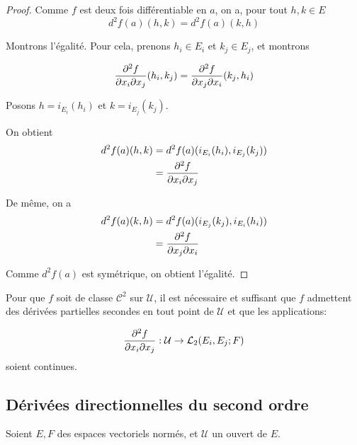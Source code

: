 \ifdefined\outputproof
\begin{proof}
	Comme $f$ est deux fois différentiable en $a$, on a, pour tout $h, k \in E$
	\begin{equation}
		d^{2}f(a) (h, k) = d^{2}f(a) (k, h)
	\end{equation}

	Montrons l'égalité. Pour cela, prenons $h_{i} \in E_{i}$ et $k_{j} \in
	E_{j}$, et montrons

	\begin{equation}
		\pdv{f}{x_{i}}{x_{j}} (a) (h_{i}, k_{j}) = \pdv{f}{x_{j}}{x_{i}} (a)
		(k_{j}, h_{i})
	\end{equation}

	Posons $h = i_{E_{i}}(h_{i})$ et $k = i_{E_{j}} (k_{j})$.

	On obtient
	\begin{align*}
		d^{2} f(a) (h, k) &= d^{2} f(a) (i_{E_{i}} (h_{i}), i_{E_{j}}(k_{j})) \\
		&= \pdv{f}{x_{i}}{x_{j}} (h_{i}, k_{j})
	\end{align*}

	De même, on a
	\begin{align*}
		d^{2} f(a) (k, h) &= d^{2} f(a) (i_{E_{j}} (k_{j}), i_{E_{i}}(h_{i})) \\
		&= \pdv{f}{x_{j}}{x_{i}} (k_{j}, h_{i})
	\end{align*}

	Comme $d^{2}f(a)$ est symétrique, on obtient l'égalité.
\end{proof}
\fi


\begin{proposition}
	Pour que $f$ soit de classe $\mathcal{C}^{2}$ sur $\mathcal{U}$, il est nécessaire et
	suffisant que $f$ admettent des dérivées partielles secondes en tout point
	de $\mathcal{U}$ et que les applications:

	\begin{equation}
		\pdv{f}{x_{i}}{x_{j}} (a) : \mathcal{U} \rightarrow
		\GScontinueHomo[2]{E_{i}, E_{j}}{F}
	\end{equation}
	soient continues.
\end{proposition}

\subsection{Dérivées directionnelles du second ordre}

Soient $E, F$ des espaces vectoriels normés, et $\mathcal{U}$ un ouvert de $E$.

